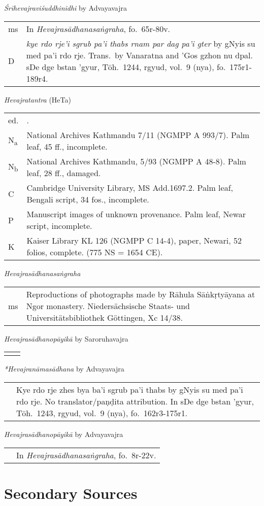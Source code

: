\documentclass[12pt,twoside]{article}
\newcommand{\mybibexclude}[1]{\addtocategory{fullcited}{#1}}
\begin{document}
\bigskip\noindent\emph{Śrīhevajraviśuddhinidhi} by Advayavajra\\
\noindent\begin{tabular}{ p{} p{} }
	ms & In \emph{Hevajrasādhanasaṅgraha}, fo.\ 65r-80v. \\
	D & \emph{kye rdo rje'i sgrub pa'i thabs rnam par dag pa'i gter} by gNyis su med pa'i rdo rje. Trans.\ by Vanaratna and 'Gos gzhon nu dpal. sDe dge bstan 'gyur, Tōh.\ 1244, rgyud, vol.\ 9 (nya), fo.\ 175r1-189r4. 
\end{tabular}

\bigskip\noindent\emph{Hevajratantra} (HeTa) \\ 
\noindent\begin{tabular}{ p{} p{} }
	ed. & \fullcite*{snellgrove1959}.\mybibexclude{snellgrove1959} \\
	N\textsubscript{a} & National Archives Kathmandu 7/11 (NGMPP A 993/7). Palm leaf, 45 ff., incomplete. \\
	N\textsubscript{b} & National Archives Kathmandu, 5/93 (NGMPP A 48-8). Palm leaf, 28 ff., damaged. \\
	C & Cambridge University Library, MS Add.1697.2. Palm leaf, Bengali script, 34 fos., incomplete. \\
	P & Manuscript images of unknown provenance. Palm leaf, Newar script, incomplete. \\
	K & Kaiser Library KL 126 (NGMPP C 14-4), paper, Newari, 52 folios, complete. (775 NS = 1654 CE). 
\end{tabular}

\bigskip\noindent\emph{Hevajrasādhanasaṅgraha}\\
\noindent\begin{tabular}{ p{} p{} }
	ms & Reproductions of photographs made by Rāhula Sāṅkṛtyāyana at Ngor monastery. Niedersächsische Staats- und Universitätsbibliothek Göttingen, Xc 14/38. 
\end{tabular}

\bigskip\noindent\emph{Hevajrasādhanopāyikā} by Saroruhavajra\\
\noindent\begin{tabular}{ p{} p{} }
	& \textcite*[vo.\ 1 pp.\ 99–121]{gerloff2020} 
\end{tabular}

\bigskip\noindent\emph{*Hevajranāmasādhana} by Advayavajra\\
\noindent\begin{tabular}{ p{} p{} }
	& Kye rdo rje zhes bya ba'i sgrub pa'i thabs by gNyis su med pa'i rdo rje. No translator/paṇḍita attribution.  In sDe dge bstan 'gyur, Tōh.\ 1243, rgyud, vol.\ 9 (nya), fo.\ 162r3-175r1. 
\end{tabular}

\bigskip\noindent\emph{Hevajrasādhanopāyikā} by Advayavajra\\
\noindent\begin{tabular}{ p{} p{} }
	& In \emph{Hevajrasādhanasaṅgraha}, fo.\ 8r-22v.
\end{tabular}

	\section*{Secondary Sources}
	\printbibliography[notcategory=fullcited,resetnumbers,heading=none]
\end{document}
